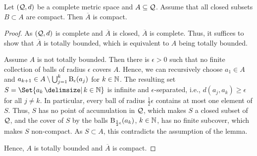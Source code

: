 \begin{lemma}\label{lmm:precompact}
Let $(\mathcal{Q}, d)$ be a complete metric space and $A\subseteq \mathcal{Q}$. Assume that all closed subsets $B\subset A$ are compact. Then $\overline A$ is compact.
\end{lemma}
\begin{proof}
	As $(\mathcal{Q}, d)$ is complete and $\overline A$ is closed, $\overline A$ is complete. Thus, it suffices to show that $\overline A$ is totally bounded, which is equivalent to $A$ being totally bounded.

	Assume $A$ is not totally bounded. Then there is $\epsilon > 0$ such that no finite collection of balls of radius $\epsilon$ covers $A$. Hence, we can recursively choose $a_1 \in A$ and $a_{k+1} \in A \setminus \bigcup_{j=1}^{k}\operatorname{\mathrm{B}}_\epsilon(a_j)$ for $k \in \mathbb{N}$. The resulting set $S = \Set{a_k \given k \in\N}$ is infinite and $\epsilon$-separated, i.e., $d(a_j, a_k) \geq \epsilon$ for all $j \neq k$. In particular, every ball of radius $\frac12\epsilon$ contains at most one element of $S$. Thus, $S$ has no point of accumulation in $\mathcal{Q}$, which makes $S$ a closed subset of $\mathcal{Q}$, and the cover of $S$ by the balls $\operatorname{\mathrm{B}}_{\frac12\epsilon}(a_k)$, $k\in\mathbb{N}$, has no finite subcover, which makes $S$ non-compact. As $S \subset A$, this contradicts the assumption of the lemma.

	Hence, $A$ is totally bounded and $\overline A$ is compact.
\end{proof}
